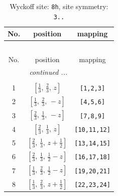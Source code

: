 \documentclass[fleqn,8pt]{jsarticle}
\begin{document}
\begin{longtable}{ccc}
\caption{Wyckoff site: {\tt 8h}, site symmetry: {\tt 3..}}
 \\
 \hline \hline
No. & position & mapping \\ \hline \endfirsthead

\multicolumn{2}{l}{\tablename\ \thetable{}} \\
 \hline \hline
No. & position & mapping \\ \hline \endhead

 \hline \hline
\multicolumn{2}{r}{\footnotesize\it continued ...} \\ \endfoot

 \hline \hline
\multicolumn{2}{r}{} \\ \endlastfoot

1 & $\left[ \frac{1}{3},\, \frac{2}{3},\, z \right]$ & {\tt [1,2,3]} \\ \hline
2 & $\left[ \frac{1}{3},\, \frac{2}{3},\, - z \right]$ & {\tt [4,5,6]} \\ \hline
3 & $\left[ \frac{2}{3},\, \frac{1}{3},\, - z \right]$ & {\tt [7,8,9]} \\ \hline
4 & $\left[ \frac{2}{3},\, \frac{1}{3},\, z \right]$ & {\tt [10,11,12]} \\ \hline
5 & $\left[ \frac{2}{3},\, \frac{1}{3},\, z + \frac{1}{2} \right]$ & {\tt [13,14,15]} \\ \hline
6 & $\left[ \frac{2}{3},\, \frac{1}{3},\, \frac{1}{2} - z \right]$ & {\tt [16,17,18]} \\ \hline
7 & $\left[ \frac{1}{3},\, \frac{2}{3},\, \frac{1}{2} - z \right]$ & {\tt [19,20,21]} \\ \hline
8 & $\left[ \frac{1}{3},\, \frac{2}{3},\, z + \frac{1}{2} \right]$ & {\tt [22,23,24]} \\
\end{longtable}
\renewcommand{\arraystretch}{1.2}
\end{document}
